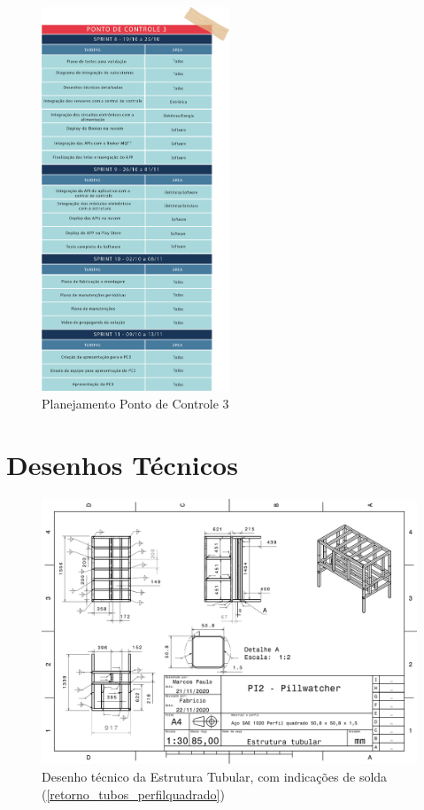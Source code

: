 \begin{apendicesenv}
\begin{figure}[H]
    \centering
    \includegraphics[width=0.5\textwidth]{figuras/gerenciamento/sprint-pc3.png}
    \caption{Planejamento Ponto de Controle 3}
    \label{fig:Sprint_pc3}
\end{figure}

\chapter{Desenhos Técnicos}\label{cad_preliminar}

\vspace{3cm}

\begin{figure}[H]
    \centering
    \includegraphics[width=1\textwidth]{figuras/estrutura/Desenhos/Estrutura_Tubular_V2.pdf}
    \caption{Desenho técnico da Estrutura Tubular, com indicações de solda (\ref{retorno_tubos_perfilquadrado})}
    \label{fig:estruturatubular}
\end{figure}


\end{apendicesenv}
